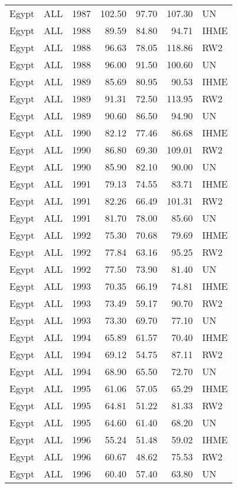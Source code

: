 \begin{longtable}{lllrrrl}
  Egypt & ALL & 1987 & 102.50 & 97.70 & 107.30 & UN \\ 
  Egypt & ALL & 1988 & 89.59 & 84.80 & 94.71 & IHME \\ 
  Egypt & ALL & 1988 & 96.63 & 78.05 & 118.86 & RW2 \\ 
  Egypt & ALL & 1988 & 96.00 & 91.50 & 100.60 & UN \\ 
  Egypt & ALL & 1989 & 85.69 & 80.95 & 90.53 & IHME \\ 
  Egypt & ALL & 1989 & 91.31 & 72.50 & 113.95 & RW2 \\ 
  Egypt & ALL & 1989 & 90.60 & 86.50 & 94.90 & UN \\ 
  Egypt & ALL & 1990 & 82.12 & 77.46 & 86.68 & IHME \\ 
  Egypt & ALL & 1990 & 86.80 & 69.30 & 109.01 & RW2 \\ 
  Egypt & ALL & 1990 & 85.90 & 82.10 & 90.00 & UN \\ 
  Egypt & ALL & 1991 & 79.13 & 74.55 & 83.71 & IHME \\ 
  Egypt & ALL & 1991 & 82.26 & 66.49 & 101.31 & RW2 \\ 
  Egypt & ALL & 1991 & 81.70 & 78.00 & 85.60 & UN \\ 
  Egypt & ALL & 1992 & 75.30 & 70.68 & 79.69 & IHME \\ 
  Egypt & ALL & 1992 & 77.84 & 63.16 & 95.25 & RW2 \\ 
  Egypt & ALL & 1992 & 77.50 & 73.90 & 81.40 & UN \\ 
  Egypt & ALL & 1993 & 70.35 & 66.19 & 74.81 & IHME \\ 
  Egypt & ALL & 1993 & 73.49 & 59.17 & 90.70 & RW2 \\ 
  Egypt & ALL & 1993 & 73.30 & 69.70 & 77.10 & UN \\ 
  Egypt & ALL & 1994 & 65.89 & 61.57 & 70.40 & IHME \\ 
  Egypt & ALL & 1994 & 69.12 & 54.75 & 87.11 & RW2 \\ 
  Egypt & ALL & 1994 & 68.90 & 65.50 & 72.70 & UN \\ 
  Egypt & ALL & 1995 & 61.06 & 57.05 & 65.29 & IHME \\ 
  Egypt & ALL & 1995 & 64.81 & 51.22 & 81.33 & RW2 \\ 
  Egypt & ALL & 1995 & 64.60 & 61.40 & 68.20 & UN \\ 
  Egypt & ALL & 1996 & 55.24 & 51.48 & 59.02 & IHME \\ 
  Egypt & ALL & 1996 & 60.67 & 48.62 & 75.53 & RW2 \\ 
  Egypt & ALL & 1996 & 60.40 & 57.40 & 63.80 & UN \\ 

\end{longtable}
